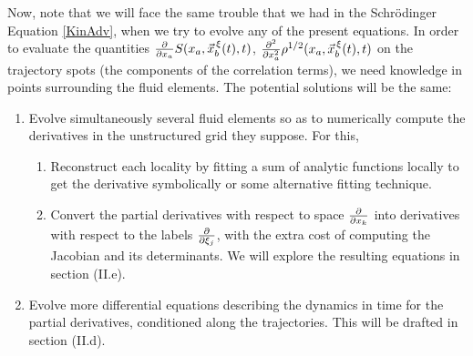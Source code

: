 \documentclass[11pt, a4paper]{article} %
\begin{document}
Now, note that we will face the same trouble that we had in the Schrödinger Equation \eqref{KinAdv}, when we try to evolve any of the present equations. In order to evaluate the quantities $\pdv{}{x_a}S(x_a, \vec{x}_b^{\, \xi}(t),t)$, $\pdv[2]{}{x_a}\rho^{1/2}(x_a, \vec{x}_b^{\, \xi}(t),t)$ on the trajectory spots (the components of the correlation terms), we need knowledge in points surrounding the fluid elements. The potential solutions will be the same:\vspace{-0.2cm}
\begin{enumerate}
\item Evolve simultaneously several fluid elements so as to numerically compute the derivatives in the unstructured grid they suppose. For this,\vspace{-0.15cm} \begin{enumerate}
\item Reconstruct each locality by fitting a sum of analytic functions locally to get the derivative symbolically or some alternative fitting technique.\vspace{-0.1cm}
\item Convert the partial derivatives with respect to space $\pdv{}{x_k}$ into derivatives with respect to the labels $\pdv{}{\xi_j}$, with the extra cost of computing the Jacobian and its determinants. We will explore the resulting equations in section (II.e). \vspace{-0.15cm}
\end{enumerate}
\item Evolve more differential equations describing the dynamics in time for the partial derivatives, conditioned along the trajectories. This will be drafted in section (II.d).
\vspace{-0.25cm}
\end{enumerate}
\end{document}
